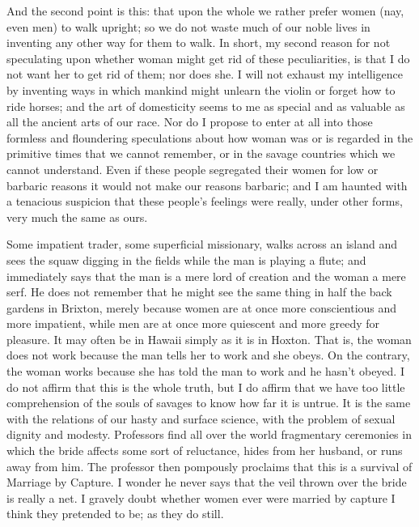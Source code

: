 \documentclass[final,10pt,letterpaper,twocolumn,openany]{book}
\begin{document}
And the second point is this: that upon the whole we rather prefer
women (nay, even men) to walk upright; so we do not waste much of our
noble lives in inventing any other way for them to walk. In short, my
second reason for not speculating upon whether woman might get rid of
these peculiarities, is that I do not want her to get rid of them; nor does she.
I will not exhaust my intelligence by inventing ways in which mankind
might unlearn the violin or forget how to ride horses; and the art of
domesticity seems to me as special and as valuable as all the ancient arts
of our race. Nor do I propose to enter at all into those formless and
floundering speculations about how woman was or is regarded in the
primitive times that we cannot remember, or in the savage countries which
we cannot understand. Even if these people segregated their women for
low or barbaric reasons it would not make our reasons barbaric; and I am
haunted with a tenacious suspicion that these people's feelings were really,
under other forms, very much the same as ours. 

Some impatient trader,
some superficial missionary, walks across an island and sees the squaw
digging in the fields while the man is playing a flute; and immediately
says that the man is a mere lord of creation and the woman a mere serf. He
does not remember that he might see the same thing in half the back
gardens in Brixton, merely because women are at once more conscientious
and more impatient, while men are at once more quiescent and more
greedy for pleasure. It may often be in Hawaii simply as it is in Hoxton.
That is, the woman does not work because the man tells her to work and
she obeys. On the contrary, the woman works because she has told the
man to work and he hasn't obeyed. I do not affirm that this is the whole
truth, but I do affirm that we have too little comprehension of the souls of
savages to know how far it is untrue. It is the same with the relations of
our hasty and surface science, with the problem of sexual dignity and
modesty. Professors find all over the world fragmentary ceremonies in
which the bride affects some sort of reluctance, hides from her husband, or
runs away from him. The professor then pompously proclaims that this is
a survival of Marriage by Capture. I wonder he never says that the veil
thrown over the bride is really a net. I gravely doubt whether women ever
were married by capture I think they pretended to be; as they do still.
\end{document}

